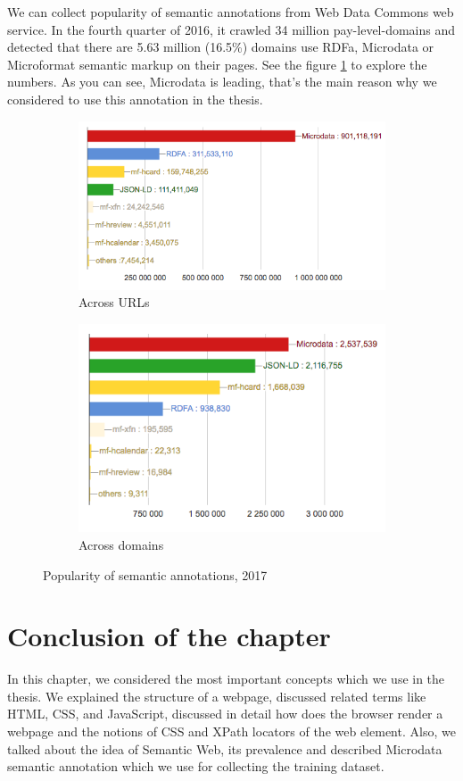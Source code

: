 We can collect popularity of semantic annotations from Web Data Commons web service. In the fourth quarter of 2016, it crawled 34 million pay-level-domains and detected that there are 5.63 million (16.5\%) domains use RDFa, Microdata or Microformat semantic markup on their pages. See the figure \ref{fig:markup} to explore the numbers. As you can see, Microdata is leading, that's the main reason why we considered to use this annotation in the thesis. \\

\begin{figure}[h]
\begin{subfigure}{.5\textwidth}
  \centering
  \includegraphics[width=1.\linewidth]{figures02/urls_meta}
  \caption{Across URLs}
\end{subfigure} 
\begin{subfigure}{.5\textwidth}
  \centering
  \includegraphics[width=.8\linewidth]{figures02/domain_meta}
  \caption{Across domains}
\end{subfigure}
\caption{Popularity of semantic annotations, 2017}
\label{fig:markup}
\end{figure}


\section*{Conclusion of the chapter}
In this chapter, we considered the most important concepts which we use in the thesis. We explained the structure of a webpage, discussed related terms like HTML, CSS, and JavaScript, discussed in detail how does the browser render a webpage and the notions of CSS and XPath locators of the web element. Also, we talked about the idea of Semantic Web, its prevalence and described Microdata semantic annotation which we use for collecting the training dataset.